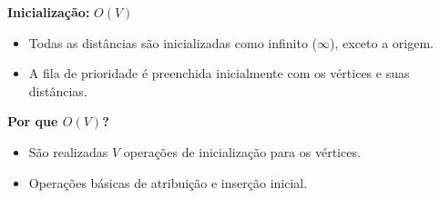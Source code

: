 \documentclass[preview]{standalone}
\begin{document}
\begin{center}
\textbf{Inicialização:} $O(V)$
            \begin{itemize}
                \item Todas as distâncias são inicializadas como infinito ($\infty$), exceto a origem.
                \item A fila de prioridade é preenchida inicialmente com os vértices e suas distâncias.
            \end{itemize}
            
            \textbf{Por que $O(V)$?}
            \begin{itemize}
                \item São realizadas $V$ operações de inicialização para os vértices.
                \item Operações básicas de atribuição e inserção inicial.
            \end{itemize}
\end{center}
\end{document}
